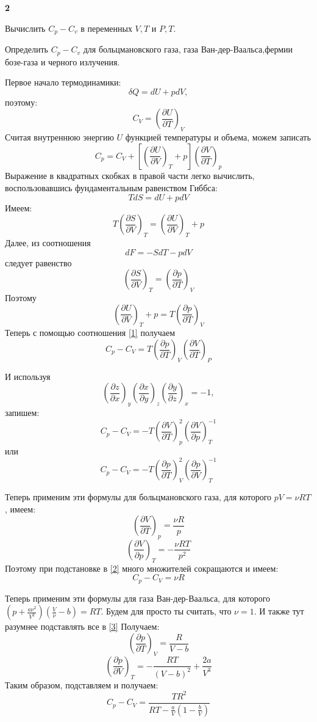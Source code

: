 \documentclass[a4paper,12pt]{article} %
\begin{document}
\begin{task}\textbf{2}

Вычислить $ C_p-C_v$ в  переменных $ V, T $ и $ P, T$. 

Определить $ C_p-C_v$ для больцмановского газа,
газа Ван-дер-Ваальса,фермии бозе-газа и черного излучения.

Первое начало термодинамики:
$$
\delta Q=d U+p d V,
$$
поэтому:
$$
C_{V}=\left(\frac{\partial U}{\partial T}\right)_{V}
$$
Считая внутреннюю энергию $U$ функцией температуры и объема, можем записать
\begin{equation}\label{1}
C_{p}=C_{V}+\left[\left(\frac{\partial U}{\partial V}\right)_{T}+p\right]\left(\frac{\partial V}{\partial T}\right)_{p}
\end{equation}
Выражение в квадратных скобках в правой части легко вычислить, воспользовавшись фундаментальным равенством Гиббса:
$$
T d S=d U+p d V
$$
Имеем:
$$
T\left(\frac{\partial S}{\partial V}\right)_{T}=\left(\frac{\partial U}{\partial V}\right)_{T}+p
$$
Далее, из соотношения
$$
d F=-S d T-p d V
$$
следует равенство
$$
\left(\frac{\partial S}{\partial V}\right)_{T}=\left(\frac{\partial p}{\partial T}\right)_{V}
$$
Поэтому
$$
\left(\frac{\partial U}{\partial V}\right)_{T}+p=T\left(\frac{\partial p}{\partial T}\right)_{V}
$$
Теперь с помощью соотношения \ref{1} получаем
$$
C_{p}-C_{V}=T\left(\frac{\partial p}{\partial T}\right)_{V}\left(\frac{\partial V}{\partial T}\right)_{P}
$$

И используя 
\[ \left(\frac{\partial z}{\partial x}\right)_{y}\left(\frac{\partial x}{\partial y}\right)_{z}\left(\frac{\partial y}{\partial z}\right)_{x}=-1, \]
запишем:
\begin{equation}\label{2}
C_{p}-C_{V}=
-T\left(\frac{\partial V}{\partial T}\right)_{p}^{2}\left(\frac{\partial V}{\partial p}\right)_{T}^{-1}
\end{equation}
или
\begin{equation}\label{3}
C_{p}-C_{V}=
-T\left(\frac{\partial p}{\partial T}\right)_{V}^{2}\left(\frac{\partial p}{\partial V}\right)_{T}^{-1}
\end{equation}


Теперь применим эти формулы для больцмановского газа, для которого $ pV=\nu RT $, имеем:
\[ \left(\frac{\partial V}{\partial T}\right)_{p}=\frac{\nu R}{p} \]
\[\left(\frac{\partial V}{\partial p}\right)_{T} =-\frac{\nu RT}{p^2} \]
Поэтому при подстановке в \ref{2} много множителей сокращаются и имеем:
\[ C_p-C_V=\nu R \]

Теперь применим эти формулы для газа Ван-дер-Ваальса, для которого $ \left(p+\frac{a\nu^2}{V^{2}}\right)\left(\frac{V}{\nu}-b\right)=R T$. 
Будем для просто ты считать, что $\nu=1$. 
И также тут разумнее подставлять все в \ref{3}
Получаем:
\[ \left(\frac{\partial p}{\partial T}\right)_{V}=\frac{R}{V-b} \]
\[ \left(\frac{\partial p}{\partial V}\right)_{T}=-\frac{RT}{(V-b)^2}+\frac{2a}{V^3} \]
Таким образом, подставляем и получаем:
\[ C_p-C_V=\frac{TR^2}{RT-\frac{a}{V}\left(1-\frac{b}{V}\right)} \]



\end{task}
\end{document}
